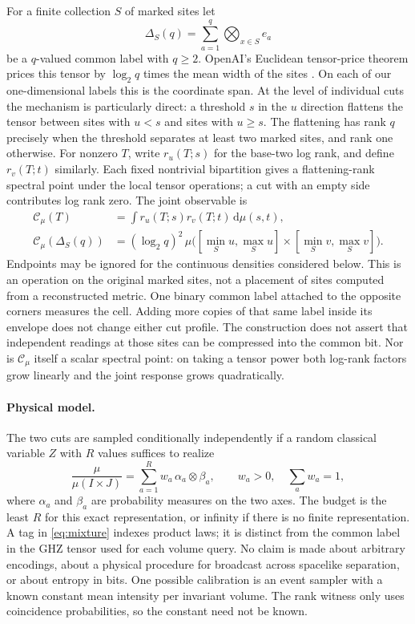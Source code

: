 \documentclass[11pt,letterpaper]{article}
\newcommand{\dd}{\mathrm{d}}
\begin{document}
For a finite collection $S$ of marked sites let
\begin{equation}
 \Delta_S(q)=\sum_{a=1}^{q}\bigotimes_{x\in S}e_a
\end{equation}
be a $q$-valued common label with $q\ge2$. OpenAI's Euclidean tensor-price theorem prices this tensor by $\log_2 q$ times the mean width of the sites \cite{OpenAI}. On each of our one-dimensional labels this is the coordinate span. At the level of individual cuts the mechanism is particularly direct: a threshold $s$ in the $u$ direction flattens the tensor between sites with $u<s$ and sites with $u\ge s$. The flattening has rank $q$ precisely when the threshold separates at least two marked sites, and rank one otherwise. For nonzero $T$, write $r_u(T;s)$ for the base-two log rank, and define $r_v(T;t)$ similarly. Each fixed nontrivial bipartition gives a flattening-rank spectral point under the local tensor operations; a cut with an empty side contributes log rank zero. The joint observable is
\begin{align}
 \mathcal C_\mu(T)&=\int r_u(T;s)r_v(T;t)\,\dd\mu(s,t),\\
 \mathcal C_\mu(\Delta_S(q))
   &=(\log_2 q)^2\,
   \mu\bigl([\min_S u,\max_S u]\times[\min_S v,\max_S v]\bigr).
 \label{eq:cut}
\end{align}
Endpoints may be ignored for the continuous densities considered below. This is an operation on the original marked sites, not a placement of sites computed from a reconstructed metric. One binary common label attached to the opposite corners measures the cell. Adding more copies of that same label inside its envelope does not change either cut profile. The construction does not assert that independent readings at those sites can be compressed into the common bit. Nor is $\mathcal C_\mu$ itself a scalar spectral point: on taking a tensor power both log-rank factors grow linearly and the joint response grows quadratically.

\paragraph{Physical model.}
The two cuts are sampled conditionally independently if a random classical variable $Z$ with $R$ values suffices to realize
\begin{equation}
 \frac{\mu}{\mu(I\times J)}
   =\sum_{a=1}^{R} w_a\,\alpha_a\otimes\beta_a,\qquad
 w_a>0,\quad \sum_a w_a=1,
 \label{eq:mixture}
\end{equation}
where $\alpha_a$ and $\beta_a$ are probability measures on the two axes. The budget is the least $R$ for this exact representation, or infinity if there is no finite representation. A tag in \eqref{eq:mixture} indexes product laws; it is distinct from the common label in the GHZ tensor used for each volume query. No claim is made about arbitrary encodings, about a physical procedure for broadcast across spacelike separation, or about entropy in bits. One possible calibration is an event sampler with a known constant mean intensity per invariant volume. The rank witness only uses coincidence probabilities, so the constant need not be known.
\end{document}
